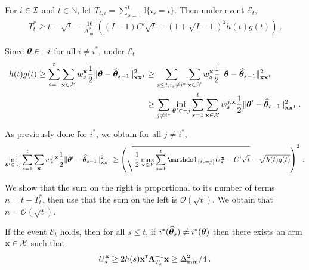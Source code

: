 \begin{theorem}
For $i\in\mathcal{I}$ and $t\in \mathbb{N}$, let $T_{t,i} = \sum_{s=1}^t \mathbb{I}\{i_s=i\}$. Then under event $\mathcal E_t$,
\begin{align*}
T_t^*
\ge t - \sqrt{t} - \frac{16}{\Delta_{\min}^2}\left((I-1)C'\sqrt{t} + (1 + \sqrt{I-1})^2 h(t)g(t)\right)
\: .
\end{align*}
\end{theorem}

Since ${\boldsymbol \theta} \in \neg i$ for all $i\neq i^*$, under $\mathcal E_t$%
\begin{align*}
h(t)g(t)
\ge \sum_{s=1}^t \sum_{{\bf x}\in\mathcal{X}} w_s^{\bf x} \frac{1}{2}\Vert {\boldsymbol \theta} - \widehat{{\boldsymbol \theta}}_{s-1} \Vert_{{\bf x}{\bf x}^\mathsf{\scriptscriptstyle T}}^2
&\ge \sum_{s\le t, i_s\neq i^*} \sum_{{\bf x}\in\mathcal{X}} w_s^{\bf x} \frac{1}{2}\Vert {\boldsymbol \theta} - \widehat{{\boldsymbol \theta}}_{s-1} \Vert_{{\bf x}{\bf x}^\mathsf{\scriptscriptstyle T}}^2
\\
&\ge \sum_{j \neq i^*} \inf_{{\boldsymbol \theta}'\in \neg j} \sum_{s = 1}^t \sum_{{\bf x}\in\mathcal{X}} w_s^{j,{\bf x}} \frac{1}{2}\Vert {\boldsymbol \theta}' - \widehat{{\boldsymbol \theta}}_{s-1} \Vert_{{\bf x}{\bf x}^\mathsf{\scriptscriptstyle T}}^2
\: .
\end{align*}

As previously done for $i^*$, we obtain for all $j\neq i^*$,
\begin{align*}
\inf_{\btheta'\in \neg j} \sum_{s = 1}^t \sum_{\bx} w_s^{j,\bx} \frac{1}{2}\Vert \btheta' - \hat{\btheta}_{s-1} \Vert_{\bx\bx\transpose}^2
\ge  \left(\sqrt{\frac{1}{2}\max_{\bx\in\cX} \sum_{s=1}^t \ind_{\{i_s=j\}} U_s^\bx - C'\sqrt{t}} - \sqrt{h(t)g(t)}\right)^2
\: .
\end{align*}

We show that the sum on the right is proportional to its number of terms $n = t - T_t^*$, then use that the sum on the left is $\mathcal O(\sqrt{t})$. We obtain that $n = \mathcal O(\sqrt{t})$.

\begin{lemma}
If the event $\mathcal E_t$ holds, then for all $s\le t$, if $i^*(\widehat{{\boldsymbol \theta}}_s) \neq i^*({\boldsymbol \theta})$ then there exists an arm ${\bf x}\in\mathcal{X}$ such that
\begin{align*}
U_s^{\bf x} \ge 2 h(s) {\bf x}^\mathsf{\scriptscriptstyle T} {\boldsymbol \Lambda}_{T_s}^{-1}{\bf x} \ge \Delta_{\min}^2/4 \: .
\end{align*}
\end{lemma}

